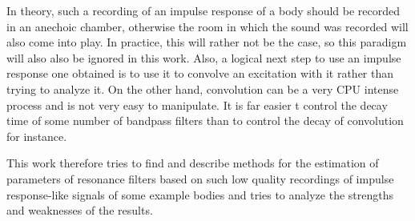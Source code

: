 In theory, such a recording of an impulse response of a body should be recorded in an anechoic chamber, otherwise the room in which the sound was recorded will also come into play. In practice, this will rather not be the case, so this paradigm will also also be ignored in this work. Also, a logical next step to use an impulse response one obtained is to use it to convolve an excitation with it rather than trying to analyze it. On the other hand, convolution can be a very CPU intense process and is not very easy to manipulate. It is far easier t control the decay time of some number of bandpass filters than to control the decay of convolution for instance.\

This work therefore tries to find and describe methods for the estimation of parameters of resonance filters based on such low quality recordings of impulse response-like signals of some example bodies and tries to analyze the strengths and weaknesses of the results.





